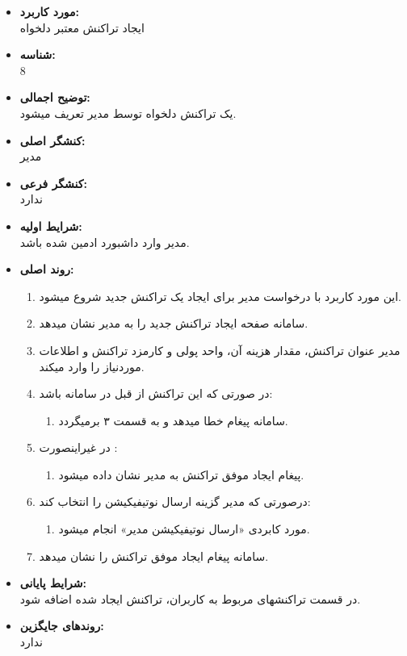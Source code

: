 \documentclass{article}
\begin{document}
\begin{itemize}
\item \textbf{مورد کاربرد:}\\
ایجاد تراکنش معتبر دلخواه
\item \textbf{شناسه:}\\
8
\item \textbf{توضیح اجمالی:}\\
یک تراکنش دلخواه توسط مدیر تعریف میشود.
\item \textbf{کنشگر اصلی:}\\
مدیر
\item \textbf{کنشگر فرعی:}\\
ندارد
\item \textbf{شرایط اولیه:}\\
مدیر وارد داشبورد ادمین شده باشد.
\item \textbf{روند اصلی:}\\
\begin{enumerate}
\item  این مورد کاربرد با درخواست مدیر برای ایجاد یک تراکنش جدید شروع میشود.
\item سامانه صفحه ایجاد تراکنش جدید را به مدیر نشان میدهد.
\item مدیر عنوان تراکنش، مقدار هزینه آن، واحد پولی و کارمزد تراکنش و اطلاعات موردنیاز را وارد میکند.
\item در صورتی که این تراکنش از قبل در سامانه باشد:
\begin{enumerate}
\item سامانه پیغام خطا میدهد و به قسمت ۳ برمیگردد. 
\end{enumerate}

\item در غیراینصورت	:
\begin{enumerate}
\item پیغام ایجاد موفق تراکنش به مدیر نشان داده میشود.
\end{enumerate}
\item  درصورتی که مدیر گزینه ارسال نوتیفیکیشن را انتخاب کند:
\begin{enumerate}
\item مورد کابردی «ارسال نوتیفیکیشن مدیر» انجام میشود.
\end{enumerate}
\item سامانه پیغام ایجاد موفق تراکنش را نشان میدهد.
\end{enumerate}

\item \textbf{شرایط پایانی:}\\ 
در قسمت تراکنشهای مربوط به کاربران، تراکنش ایجاد شده اضافه شود.
\item \textbf{روندهای جایگزین:}\\
ندارد
\end{itemize}
\end{document}
